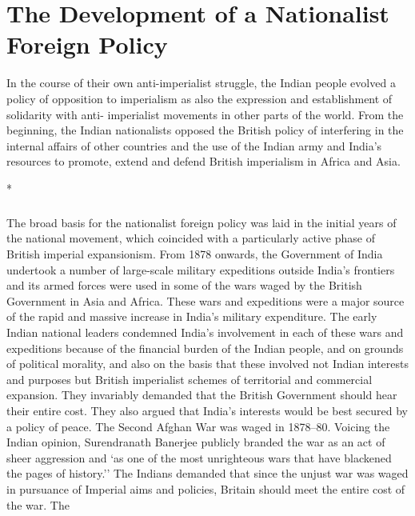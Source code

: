 \chapter{The Development of a Nationalist Foreign Policy}
\begin{multicols}{2}

In the course of their own anti-imperialist struggle, the Indian people evolved a policy of opposition to imperialism as also the expression and establishment of solidarity with anti- imperialist movements in other parts of the world. From the beginning, the Indian nationalists opposed the British policy of interfering in the internal affairs of other countries and the use of the Indian army and India's resources to promote, extend and defend British imperialism in Africa and Asia.

\begin{center}*\end{center}

\paragraph*{}

The broad basis for the nationalist foreign policy was laid in the initial years of the national movement, which coincided with a particularly active phase of British imperial expansionism. From 1878 onwards, the Government of India undertook a number of large-scale military expeditions outside India's frontiers and its armed forces were used in some of the wars waged by the British Government in Asia and Africa. These wars and expeditions were a major source of the rapid and massive increase in India's military expenditure. The early Indian national leaders condemned India's involvement in each of these wars and expeditions because of the financial burden of the Indian people, and on grounds of political morality, and also on the basis that these involved not Indian interests and purposes but British imperialist schemes of territorial and commercial expansion. They invariably demanded that the British Government should hear their entire cost. They also argued that India's interests would be best secured by a policy of peace. The Second Afghan War was waged in 1878--80. Voicing the Indian opinion, Surendranath Banerjee publicly branded the war as an act of sheer aggression and `as one of the most unrighteous wars that have blackened the pages of history.'' The Indians demanded that since the unjust war was waged in pursuance of Imperial aims and policies, Britain should meet the entire cost of the war. The 


\end{multicols}
